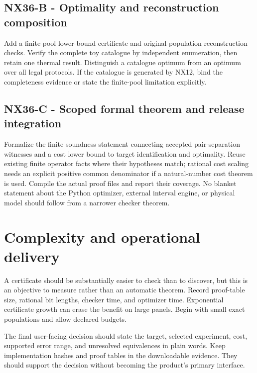 \documentclass[
  11pt,
  a4paper,
]{report}
\begin{document}
\hypertarget{nx36-b---optimality-and-reconstruction-composition}{%
\subsection{NX36-B - Optimality and reconstruction
composition}\label{nx36-b---optimality-and-reconstruction-composition}}

Add a finite-pool lower-bound certificate and original-population
reconstruction checks. Verify the complete toy catalogue by independent
enumeration, then retain one thermal result. Distinguish a catalogue
optimum from an optimum over all legal protocols. If the catalogue is
generated by NX12, bind the completeness evidence or state the
finite-pool limitation explicitly.

\hypertarget{nx36-c---scoped-formal-theorem-and-release-integration}{%
\subsection{NX36-C - Scoped formal theorem and release
integration}\label{nx36-c---scoped-formal-theorem-and-release-integration}}

Formalize the finite soundness statement connecting accepted
pair-separation witnesses and a cost lower bound to target
identification and optimality. Reuse existing finite operator facts
where their hypotheses match; rational cost scaling needs an explicit
positive common denominator if a natural-number cost theorem is used.
Compile the actual proof files and report their coverage. No blanket
statement about the Python optimizer, external interval engine, or
physical model should follow from a narrower checker theorem.

\hypertarget{complexity-and-operational-delivery}{%
\section{Complexity and operational
delivery}\label{complexity-and-operational-delivery}}

A certificate should be substantially easier to check than to discover,
but this is an objective to measure rather than an automatic theorem.
Record proof-table size, rational bit lengths, checker time, and
optimizer time. Exponential certificate growth can erase the benefit on
large panels. Begin with small exact populations and allow declared
budgets.

The final user-facing decision should state the target, selected
experiment, cost, supported error range, and unresolved equivalences in
plain words. Keep implementation hashes and proof tables in the
downloadable evidence. They should support the decision without becoming
the product's primary interface.
\end{document}

